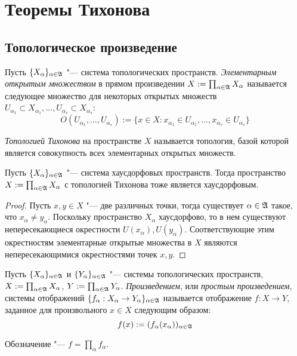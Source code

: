 \section{Теоремы Тихонова}

\subsection{Топологическое произведение}

\begin{definition}
    Пусть $\lbrace X_{\alpha}\rbrace_{\alpha \in \mathfrak A}$ "--- система топологических пространств. \textit{Элементарным открытым множеством} в прямом произведении $X := \prod_{\alpha \in \mathfrak A}X_{\alpha}$ называется следующее множество для некоторых открытых множеств $U_{\alpha_1} \subset X_{\alpha_1}, \dotsc, U_{\alpha_s} \subset X_{\alpha_s}$:
    \[O(U_{\alpha_1}, \ldots, U_{\alpha_s}) := \lbrace x \in X: x_{\alpha_1} \in U_{\alpha_1}, \dotsc, x_{\alpha_s} \in U_{\alpha_s}\rbrace\]

    \textit{Топологией Тихонова} на пространстве $X$ называется топология, базой которой является совокупность всех элементарных открытых множеств.
\end{definition}

\begin{proposition}
    Пусть $\lbrace X_{\alpha}\rbrace_{\alpha \in \mathfrak A}$ "--- система хаусдорфовых пространств. Тогда пространство $X := \prod_{\alpha \in \mathfrak A}X_{\alpha}$ с топологией Тихонова тоже является хаусдорфовым.
\end{proposition}

\begin{proof}
    Пусть $x, y \in X$ "--- две различных точки, тогда существует $\alpha \in \mathfrak A$ такое, что $x_\alpha \ne y_\alpha$. Поскольку пространство $X_\alpha$ хаусдорфово, то в нем существуют непересекающиеся окрестности $U(x_\alpha), U(y_\alpha)$. Соответствующие этим окрестностям элементарные открытые множества в $X$ являются непересекающимися окрестностями точек $x, y$.
\end{proof}

\begin{definition}
    Пусть $\lbrace X_{\alpha}\rbrace_{\alpha \in \mathfrak A}$ и $\lbrace Y_{\alpha}\rbrace_{\alpha \in \mathfrak A}$ "--- системы топологических пространств, $X := \prod_{\alpha \in \mathfrak A}X_{\alpha}$, $Y := \prod_{\alpha \in \mathfrak A}Y_{\alpha}$. \textit{Произведением}, или \textit{простым произведением}, системы отображений $\{f_\alpha: X_\alpha \to Y_\alpha\}_{\alpha \in \mathfrak A}$ называется отображение $f : X \to Y$, заданное для произвольного $x \in X$ следующим образом:
    \[f(x) := (f_\alpha(x_\alpha))_{\alpha \in \mathfrak A}\]

    Обозначение "--- $f = \prod_{\alpha}f_{\alpha}$.
\end{definition}

